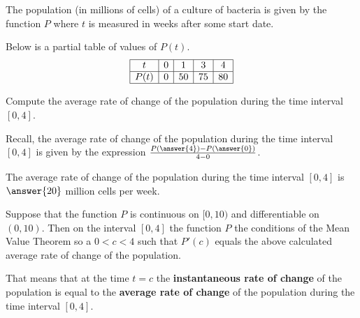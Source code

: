 \documentclass{ximera}
\author{Nela Lakos \and Kyle Parsons}
\begin{document}
The population (in millions of cells) of a culture of bacteria is given by the function $P$ where $t$ is measured in weeks after some start date.

Below is a partial table of values of $P(t)$.
\[
\begin{array}{|c|c|c|c|c|}
\hline
t & 0 & 1 & 3 & 4\\\hline
P(t) & 0 & 50 & 75 & 80\\\hline
\end{array} 
\]
\begin{exercise}
Compute the average rate of change of the population during the time interval $[0,4]$.
\begin{hint}
Recall, the average rate of change of the population during the time interval $[0,4]$ is given by the expression $\frac{P(\answer{4})-P(\answer{0})}{4-0}$.
\end{hint}
The average rate of change of the population during the time interval $[0,4]$ is $\answer{20}$ million cells per week.
\end{exercise}
\begin{exercise}
Suppose that  the function $P$ is continuous on $[0,10)$ and differentiable on $(0,10)$. Then  on the interval $[0,4]$ the function $P$   the conditions of the Mean Value Theorem so  a $0<c<4$ such that $P'(c)$ equals the above calculated average rate of change of the population.

That means that at the time $t=c$ the \textbf{instantaneous rate of change} of the population is equal to the \textbf{average rate of change} of the population during the time interval $[0,4]$.
\end{exercise}
\end{document}
